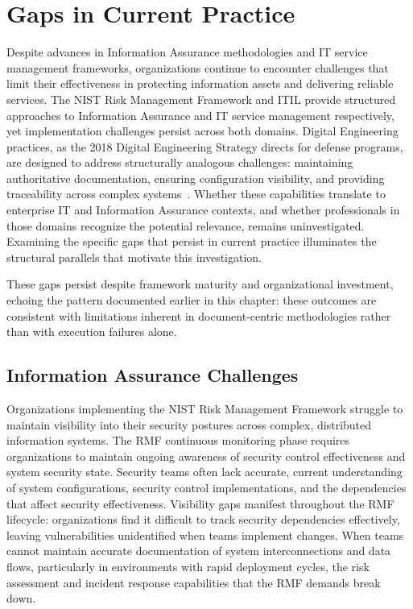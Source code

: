 \section{Gaps in Current Practice}

Despite advances in Information Assurance methodologies and IT service management frameworks, organizations continue to encounter challenges that limit their effectiveness in protecting information assets and delivering reliable services. The NIST Risk Management Framework and ITIL provide structured approaches to Information Assurance and IT service management respectively, yet implementation challenges persist across both domains. Digital Engineering practices, as the 2018 Digital Engineering Strategy directs for defense programs, are designed to address structurally analogous challenges: maintaining authoritative documentation, ensuring configuration visibility, and providing traceability across complex systems~\parencite{DoD_DE_Strategy_2018}. Whether these capabilities translate to enterprise IT and Information Assurance contexts, and whether professionals in those domains recognize the potential relevance, remains uninvestigated. Examining the specific gaps that persist in current practice illuminates the structural parallels that motivate this investigation.

These gaps persist despite framework maturity and organizational investment, echoing the pattern documented earlier in this chapter: these outcomes are consistent with limitations inherent in document-centric methodologies rather than with execution failures alone.

\subsection{Information Assurance Challenges}

Organizations implementing the NIST Risk Management Framework struggle to maintain visibility into their security postures across complex, distributed information systems. The RMF continuous monitoring phase requires organizations to maintain ongoing awareness of security control effectiveness and system security state. Security teams often lack accurate, current understanding of system configurations, security control implementations, and the dependencies that affect security effectiveness. Visibility gaps manifest throughout the RMF lifecycle: organizations find it difficult to track security dependencies effectively, leaving vulnerabilities unidentified when teams implement changes. When teams cannot maintain accurate documentation of system interconnections and data flows, particularly in environments with rapid deployment cycles, the risk assessment and incident response capabilities that the RMF demands break down.


